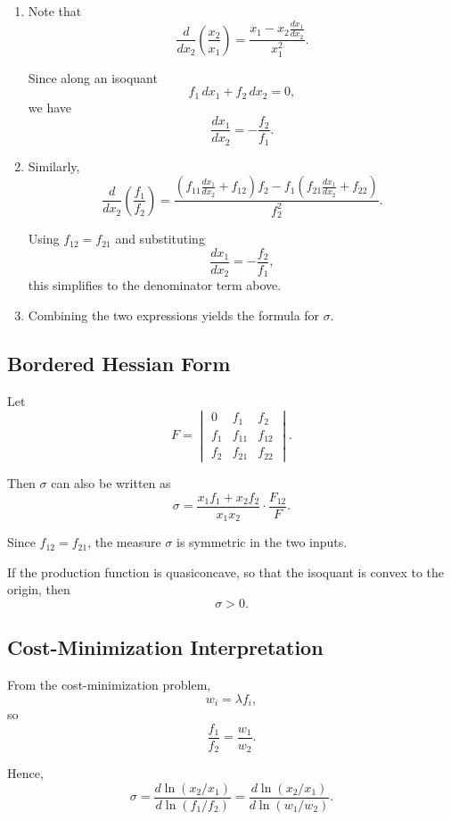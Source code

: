 \begin{enumerate}
    \item Note that
    \[
    \frac{d}{dx_2}\left(\frac{x_2}{x_1}\right)
    =
    \frac{x_1 - x_2 \frac{dx_1}{dx_2}}{x_1^2}.
    \]

    Since along an isoquant
    \[
    f_1\,dx_1 + f_2\,dx_2 = 0,
    \]
    we have
    \[
    \frac{dx_1}{dx_2} = -\frac{f_2}{f_1}.
    \]

    \item Similarly,
    \[
    \frac{d}{dx_2}\left(\frac{f_1}{f_2}\right)
    =
    \frac{\left(f_{11}\frac{dx_1}{dx_2} + f_{12}\right)f_2
    -
    f_1\left(f_{21}\frac{dx_1}{dx_2} + f_{22}\right)}
    {f_2^2}.
    \]

    Using $f_{12}=f_{21}$ and substituting
    \[
    \frac{dx_1}{dx_2}=-\frac{f_2}{f_1},
    \]
    this simplifies to the denominator term above.

    \item Combining the two expressions yields the formula for $\sigma$.
\end{enumerate}

\subsection*{Bordered Hessian Form}

Let
\[
F =
\begin{vmatrix}
0 & f_1 & f_2 \\
f_1 & f_{11} & f_{12} \\
f_2 & f_{21} & f_{22}
\end{vmatrix}.
\]

Then $\sigma$ can also be written as
\[
\sigma
=
\frac{x_1 f_1 + x_2 f_2}{x_1 x_2}\cdot \frac{F_{12}}{F}.
\]

Since $f_{12}=f_{21}$, the measure $\sigma$ is symmetric in the two inputs.

If the production function is quasiconcave, so that the isoquant is convex
to the origin, then
\[
\sigma > 0.
\]

\subsection*{Cost-Minimization Interpretation}

From the cost-minimization problem,
\[
w_i = \lambda f_i,
\]
so
\[
\frac{f_1}{f_2} = \frac{w_1}{w_2}.
\]

Hence,
\[
\sigma
=
\frac{d\ln(x_2/x_1)}{d\ln(f_1/f_2)}
=
\frac{d\ln(x_2/x_1)}{d\ln(w_1/w_2)}.
\]

